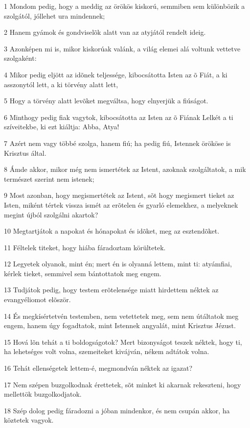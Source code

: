 \par 1 Mondom pedig, hogy a meddig az örökös kiskorú, semmiben sem különbözik a szolgától, jóllehet ura mindennek;
\par 2 Hanem gyámok és gondviselõk alatt van az atyjától rendelt ideig.
\par 3 Azonképen mi is, mikor kiskorúak valánk, a világ elemei alá voltunk vettetve szolgaként:
\par 4 Mikor pedig eljött az idõnek teljessége, kibocsátotta Isten az õ Fiát, a ki asszonytól lett, a ki törvény alatt lett,
\par 5 Hogy a törvény alatt levõket megváltsa, hogy elnyerjük a fiúságot.
\par 6 Minthogy pedig fiak vagytok, kibocsátotta az Isten az õ Fiának Lelkét a ti szíveitekbe, ki ezt kiáltja: Abba, Atya!
\par 7 Azért nem vagy többé szolga, hanem fiú; ha pedig fiú, Istennek örököse is Krisztus által.
\par 8 Ámde akkor, mikor még nem ismertétek az Istent, azoknak szolgáltatok, a mik természet szerint nem istenek;
\par 9 Most azonban, hogy megismertétek az Istent, sõt hogy megismert tieket az Isten, miként tértek vissza ismét az erõtelen és gyarló elemekhez, a melyeknek megint újból szolgálni akartok?
\par 10 Megtartjátok a napokat és hónapokat  és idõket, meg az esztendõket.
\par 11 Féltelek titeket, hogy hiába fáradoztam körültetek.
\par 12 Legyetek olyanok, mint én; mert én is olyanná lettem, mint ti: atyámfiai, kérlek tieket, semmivel sem bántottatok meg engem.
\par 13 Tudjátok pedig, hogy testem erõtelensége miatt hirdettem néktek az evangyéliomot elõször.
\par 14 És megkísértetvén testemben, nem vetettetek meg, sem nem útáltatok meg engem, hanem úgy fogadtatok, mint Istennek angyalát, mint Krisztus Jézust.
\par 15 Hová lõn tehát a ti boldogságotok? Mert bizonyságot teszek néktek, hogy ti, ha lehetséges volt volna, szemeiteket kivájván, nékem adtátok volna.
\par 16 Tehát ellenségetek lettem-é, megmondván néktek az igazat?
\par 17 Nem szépen buzgolkodnak érettetek, sõt minket ki akarnak rekeszteni, hogy mellettök buzgolkodjatok.
\par 18 Szép dolog pedig fáradozni a jóban mindenkor, és nem csupán akkor, ha köztetek vagyok.
